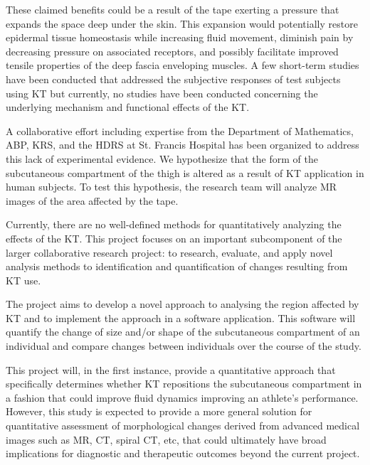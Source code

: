 \documentclass[letterpaper, 12 pt, conference]{ieeeconf}  %
\begin{document}
These claimed benefits could be a result of the tape exerting a pressure that expands the space deep under the skin.  This expansion would potentially restore epidermal tissue homeostasis while increasing fluid movement, diminish pain by decreasing pressure on associated receptors, and possibly facilitate improved tensile properties of the deep fascia enveloping muscles. A few short-term studies have been conducted that addressed the subjective responses of test subjects using \ac{KT} \cite{Konishi2013}\cite{Osorio2013} \cite{OSullivan2011} but currently, no studies have been conducted concerning the underlying mechanism and functional effects of the \ac{KT}.

A collaborative effort including expertise from the Department of Mathematics, \ac{ABP}, \ac{KRS}, and the \ac{HDRS} at St. Francis Hospital has been organized to address this lack of experimental evidence. We hypothesize that the form of the subcutaneous compartment of the thigh is altered as a result of KT application in human subjects. To test this hypothesis, the research team will analyze MR images of the area affected by the tape. 

Currently, there are no well-defined methods for quantitatively analyzing the effects of the \ac{KT}.  This project focuses on an important subcomponent of the larger collaborative research project: to research, evaluate, and apply novel analysis methods to identification and quantification of changes resulting from \ac{KT} use.  

The project aims to develop a novel approach to analysing the region affected by \ac{KT} and to implement the approach in a software application.  This software will quantify the change of size and/or shape of the subcutaneous compartment of an individual and compare changes between individuals over the course of the study.


This project will, in the first instance, provide a quantitative approach that specifically determines whether KT repositions the subcutaneous compartment in a fashion that could improve fluid dynamics improving an athlete's performance.  However, this study is expected to provide a more general solution for quantitative assessment of morphological changes derived from advanced medical images such as MR, CT, spiral CT, etc, that could ultimately have broad implications for diagnostic and therapeutic outcomes beyond the current project.  
\end{document}
